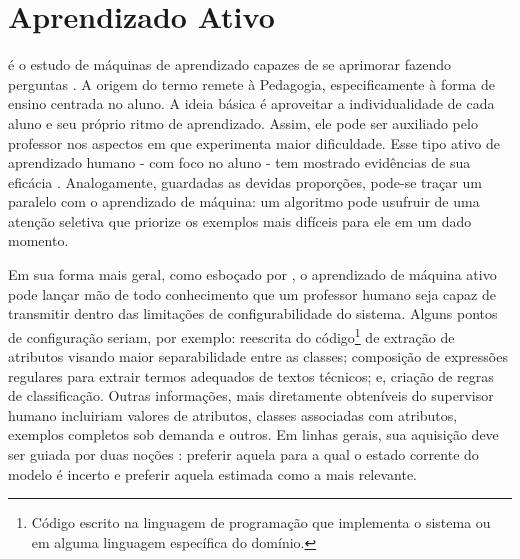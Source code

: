 \section{Aprendizado Ativo} \label{aprendizado-ativo}
 é o estudo de máquinas
de aprendizado capazes de se aprimorar fazendo perguntas \citep{series/synthesis/2012Settles}.
A origem do termo remete à Pedagogia, especificamente à forma de ensino centrada no aluno.
A ideia básica é aproveitar a individualidade de cada aluno e seu próprio ritmo de aprendizado.
Assim, ele pode ser auxiliado pelo professor nos aspectos em que experimenta maior dificuldade.
Esse tipo ativo de aprendizado humano - com foco no aluno - tem mostrado evidências
de sua eficácia \citep{michael2006s}.
Analogamente, guardadas as devidas proporções,
pode-se traçar um paralelo com o aprendizado de máquina:
um algoritmo pode usufruir de uma atenção seletiva que
priorize os exemplos mais difíceis para ele em um dado momento.

Em sua forma mais geral, como esboçado por \cite{forman2012programmer},
o aprendizado de máquina ativo pode lançar mão de todo conhecimento que um professor
humano seja capaz de transmitir dentro das limitações de configurabilidade do sistema.
Alguns pontos de configuração seriam, por exemplo:
reescrita do código\footnote{Código escrito na linguagem de
programação que implementa o sistema ou em alguma linguagem específica do domínio.}
de extração de atributos visando maior separabilidade entre as
 classes; composição de expressões regulares para extrair termos adequados de textos técnicos;
e, criação de regras de classificação.
Outras informações, mais diretamente obteníveis do supervisor humano incluiriam
 valores de atributos, classes associadas com atributos, exemplos completos sob demanda e outros.
Em linhas gerais, sua aquisição deve ser guiada por duas noções
 \citep{krishnapuram2011cost}:
preferir aquela para a qual o estado corrente do modelo é incerto e
preferir aquela estimada como a mais relevante.

